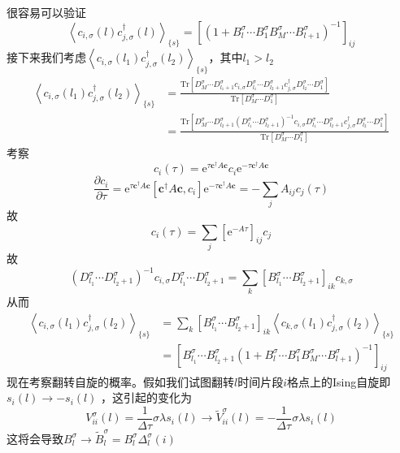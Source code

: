 \documentclass[UTF8,cs4size]{ctexart}
\def\ee{\mathrm e}
\begin{document}
很容易可以验证
\[
    \left< c_{i,\sigma}(l) c^{\dag}_{j,\sigma}(l) \right>_{\{s\}} 
    = \left[\left(1+B_{l}^{\sigma} \cdots B_{1}^{\sigma}
    B_{M}^{\sigma} \cdots  B_{l+1}^{\sigma} \right)^{-1} \right]_{ij}
\]
接下来我们考虑$\left< c_{i,\sigma}(l_1) c^{\dag}_{j,\sigma}(l_2) \right>_{\{s\}}$，其中$l_1>l_2$
\[
    \begin{aligned}
    \left< c_{i,\sigma}(l_1) c^{\dag}_{j,\sigma}(l_2) \right>_{\{s\}}
    &=\frac{\mathrm{Tr} [D^{\sigma}_{M} \cdots D^{\sigma}_{l_1 +1} c_{i,\sigma}
    D^{\sigma}_{l_1} \cdots D^{\sigma}_{l_2 +1} c^{\dag}_{j,\sigma} 
    D^{\sigma}_{l_2} \cdots D^{\sigma}_{1}  ]}
    {\mathrm{Tr} [D^{\sigma}_{M} \cdots D^{\sigma}_{1}]}\\
    &=\frac{\mathrm{Tr} [D^{\sigma}_{M} \cdots D^{\sigma}_{l_2 +1}
    (D^{\sigma}_{l_1} \cdots D^{\sigma}_{l_2 +1})^{-1} c_{i,\sigma}
    D^{\sigma}_{l_1} \cdots D^{\sigma}_{l_2 +1} c^{\dag}_{j,\sigma} 
    D^{\sigma}_{l_2} \cdots D^{\sigma}_{1}  ]}
    {\mathrm{Tr} [D^{\sigma}_{M} \cdots D^{\sigma}_{1}]}
    \end{aligned}
\]
考察
\[
    c_{i}(\tau) =\ee^{\tau \mathbf{c^{\dag}} A \mathbf{c}}  c_{i}  
    \ee^{-\tau \mathbf{c^{\dag}} A \mathbf{c}}
\]
\[
    \frac{\partial c_{i}}{\partial \tau}   =  \ee^{\tau \mathbf{c^{\dag}} A \mathbf{c}}
    [\mathbf{c^{\dag}} A \mathbf{c},c_{i} ] \ee^{-\tau \mathbf{c^{\dag}} A \mathbf{c}}
    = -\sum_{j} A_{ij} c_{j}(\tau)
\]
故
\[
    c_{i}(\tau) = \sum_{j} \left[\ee^{-A \tau}\right]_{ij} c_{j}
\]
故
\[
    (D^{\sigma}_{l_1} \cdots D^{\sigma}_{l_2 +1})^{-1} c_{i,\sigma}
    D^{\sigma}_{l_1} \cdots D^{\sigma}_{l_2 +1}
    = \sum_{k} [B^{\sigma}_{l_1} \cdots B^{\sigma}_{l_2 +1}]_{ik} c_{k,\sigma}
\]
从而
\[
    \begin{aligned}
    \left< c_{i,\sigma}(l_1) c^{\dag}_{j,\sigma}(l_2) \right>_{\{s\}}
    &=\sum_{k} [B^{\sigma}_{l_1} \cdots B^{\sigma}_{l_2 +1}]_{ik} 
    \left< c_{k,\sigma}(l_1) c^{\dag}_{j,\sigma}(l_2) \right>_{\{s\}}\\
    &=\left[B^{\sigma}_{l_1} \cdots B^{\sigma}_{l_2 +1}
    \left(1+B_{l}^{\sigma} \cdots B_{1}^{\sigma}
    B_{M}^{\sigma} \cdots  B_{l+1}^{\sigma} \right)^{-1}
    \right]_{ij}
    \end{aligned}
\]
现在考察翻转自旋的概率。假如我们试图翻转$l$时间片段$i$格点上的Ising自旋即$s_{i}(l) \rightarrow -s_{i}(l)$
，这引起的变化为
\[
    V^{\sigma}_{ii}(l) =\frac{1}{\Delta \tau} \sigma \lambda s_{i}(l)
    \rightarrow
    \tilde{V}^{\sigma}_{ii}(l) = -\frac{1}{\Delta \tau} \sigma \lambda s_{i}(l)
\]
这将会导致$B^{\sigma}_{l} \rightarrow \tilde{B}^{\sigma}_{l} = B^{\sigma}_{l} \Delta^{\sigma}_{l}(i)$
\end{document}
